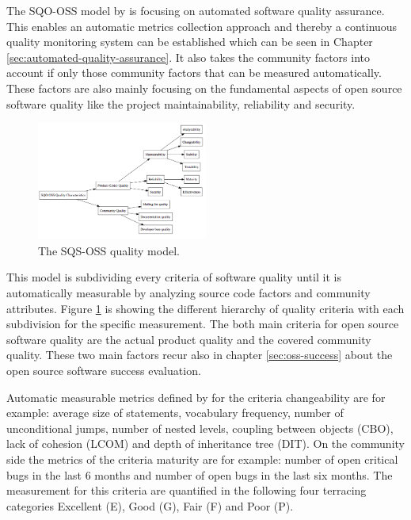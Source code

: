 \documentclass[DIV=calc,paper=a4,fontsize=9pt,twocolumn]{scrartcl}
\begin{document}
The SQO-OSS model by \citet{samoladas2008sqo} is focusing on automated software quality assurance. This enables an automatic metrics collection approach and thereby a continuous quality monitoring system can be established which can be seen in Chapter \ref{sec:automated-quality-assurance}. It also takes the community factors into account if only those community factors that can be measured automatically. These factors are also mainly focusing on the fundamental aspects of open source software quality like the project maintainability, reliability and security. 

\begin{figure}[ht]
    \includegraphics[width=0.5\textwidth ]{img/sqsoss.png}{}
    \centering
    \caption{The SQS-OSS quality model. \citet{samoladas2008sqo}}\label{fig:sqs-oss}
\end{figure}

This model is subdividing every criteria of software quality until it is automatically measurable by analyzing source code factors and community attributes. Figure \ref{fig:sqs-oss} is showing the different hierarchy of quality criteria with each subdivision for the specific measurement. The both main criteria for open source software quality are the actual product quality and the covered community quality. These two main factors recur also in chapter \ref{sec:oss-success} about the open source software success evaluation.

Automatic measurable metrics defined by \citet{samoladas2008sqo} for the criteria changeability are for example: average size of statements, vocabulary frequency, number of unconditional jumps, number of nested levels, coupling between objects (CBO), lack of cohesion (LCOM) and depth of inheritance tree (DIT). On the community side the metrics of the criteria maturity are for example: number of open critical bugs in the last 6 months and number of open bugs in the last six months. The measurement for this criteria are quantified in the following four terracing categories Excellent (E), Good (G), Fair (F) and Poor (P). \citep{samoladas2008sqo}
\end{document}

